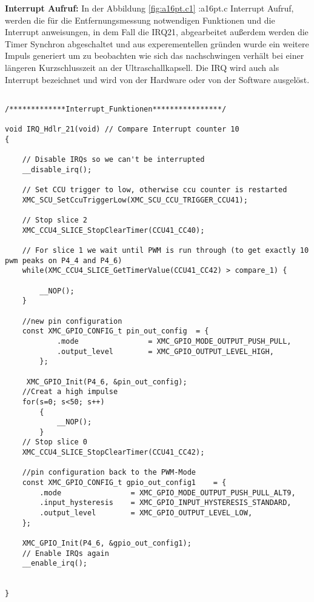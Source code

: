 \textbf{Interrupt Aufruf:}
In der Abbildung \ref{fig:a16pt.c1} :a16pt.c Interrupt Aufruf, werden die für die Entfernungsmessung notwendigen Funktionen und die Interrupt anweisungen, in dem Fall die IRQ21, abgearbeitet außerdem werden die Timer Synchron abgeschaltet und aus experementellen gründen wurde ein weitere Impuls generiert um zu beobachten wie sich das nachschwingen verhält bei einer längeren Kurzschlusszeit an der Ultraschallkapsell. Die IRQ wird auch als Interrupt bezeichnet und wird von der Hardware oder von der Software ausgelöst.
\\
\begin{minipage}{1\textwidth}
\begin{lstlisting}

/*************Interrupt_Funktionen****************/

void IRQ_Hdlr_21(void) // Compare Interrupt counter 10
{

	// Disable IRQs so we can't be interrupted
	__disable_irq();

	// Set CCU trigger to low, otherwise ccu counter is restarted
	XMC_SCU_SetCcuTriggerLow(XMC_SCU_CCU_TRIGGER_CCU41);

	// Stop slice 2
	XMC_CCU4_SLICE_StopClearTimer(CCU41_CC40);

	// For slice 1 we wait until PWM is run through (to get exactly 10 pwm peaks on P4_4 and P4_6)
	while(XMC_CCU4_SLICE_GetTimerValue(CCU41_CC42) > compare_1) {

		__NOP();
	}
	
	//new pin configuration
	const XMC_GPIO_CONFIG_t pin_out_config	= {
			.mode                = XMC_GPIO_MODE_OUTPUT_PUSH_PULL,
			.output_level        = XMC_GPIO_OUTPUT_LEVEL_HIGH,
		};

	 XMC_GPIO_Init(P4_6, &pin_out_config);
	//Creat a high impulse
	for(s=0; s<50; s++)
		{
			__NOP();
		}
	// Stop slice 0
	XMC_CCU4_SLICE_StopClearTimer(CCU41_CC42);
	
	//pin configuration back to the PWM-Mode
	const XMC_GPIO_CONFIG_t gpio_out_config1	= {
		.mode                = XMC_GPIO_MODE_OUTPUT_PUSH_PULL_ALT9,
		.input_hysteresis    = XMC_GPIO_INPUT_HYSTERESIS_STANDARD,
		.output_level        = XMC_GPIO_OUTPUT_LEVEL_LOW,
	};

	XMC_GPIO_Init(P4_6, &gpio_out_config1);
	// Enable IRQs again
	__enable_irq();


}
\end{lstlisting}
\label{fig:a16pt.c1}
\end{minipage}


